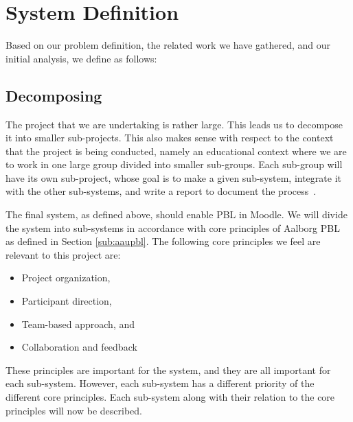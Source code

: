 \chapter{System Definition}
\label{sec:systemDef}
Based on our problem definition, the related work we have gathered, and our initial analysis, we define \system{} as follows:


\section{Decomposing \system}
\label{sub:decomposingSys}
The project that we are undertaking is rather large.
This leads us to decompose it into smaller sub-projects.
This also makes sense with respect to the context that the project is being conducted, namely an educational context where we are to work in one large group divided into smaller sub-groups.
Each sub-group will have its own sub-project, whose goal is to make a given sub-system, integrate it with the other sub-systems, and write a report to document the process~\cite{sw6studieordning}.

The final system, as defined above, should enable PBL in Moodle.
We will divide the system into sub-systems in accordance with core principles of Aalborg PBL as defined in Section \ref{sub:aaupbl}.
The following core principles we feel are relevant to this project are:

\begin{itemize}
	\item Project organization,
  \item Participant direction,
  \item Team-based approach, and
  \item Collaboration and feedback
\end{itemize}

These principles are important for the system, and they are all important for each sub-system.
However, each sub-system has a different priority of the different core principles.
Each sub-system along with their relation to the core principles will now be described.


